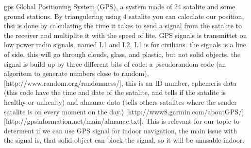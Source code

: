 gps
Global Positioning System (GPS), a system made of 24 satalite and some ground stations. By triangulering using 4 satalite you can calculate our position, thsi is done by calculating the time it takes to send a signal from the satalite  to  the receiver and multiplite it with the speed of lite. GPS signals is transmittet on low power radio signals, named L1 and L2, L1 is for civilians. the signals is a line of side, this will go through clouds, glass, and plastic, but not solid objects. the signal is build up by three different bits of code: a pseudorandom code (an algoritem to generate numbers close to random), [http://www.random.org/randomness/], this is an ID number, ephemeris data (this code have the time and date of the satalite, and tells if the satalite  is healthy or unhealty) and almanac data (tells others satalites where the sender satalite is on every moment on the day.) [http://www8.garmin.com/aboutGPS/] [http://gpsinformation.net/main/almanac.txt]. This is relevant for our topic to determent if we  can use GPS signal for indoor navigation, the main issue with the signal is, that solid object can block the signal, so it will be unusable indoor. 